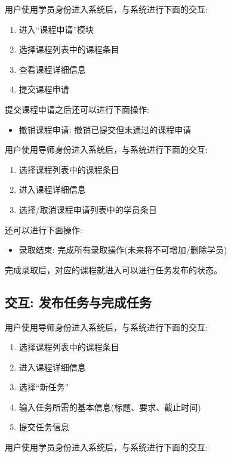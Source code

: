 用户使用学员身份进入系统后，与系统进行下面的交互:

\begin{enumerate}
  \item 进入“课程申请”模块
  \item 选择课程列表中的课程条目
  \item 查看课程详细信息
  \item 提交课程申请
\end{enumerate}

提交课程申请之后还可以进行下面操作:

\begin{itemize}
  \item 撤销课程申请: 撤销已提交但未通过的课程申请
\end{itemize}

用户使用导师身份进入系统后，与系统进行下面的交互:

\begin{enumerate}
  \item 选择课程列表中的课程条目
  \item 进入课程详细信息
  \item 选择/取消课程申请列表中的学员条目
\end{enumerate}

还可以进行下面操作:

\begin{itemize}
  \item 录取结束: 完成所有录取操作(未来将不可增加/删除学员)
\end{itemize}

完成录取后，对应的课程就进入可以进行任务发布的状态。

\subsection {交互: 发布任务与完成任务}

用户使用导师身份进入系统后，与系统进行下面的交互:

\begin{enumerate}
  \item 选择课程列表中的课程条目
  \item 进入课程详细信息
  \item 选择“新任务”
  \item 输入任务所需的基本信息(标题、要求、截止时间)
  \item 提交任务信息
\end{enumerate}

用户使用学员身份进入系统后，与系统进行下面的交互:

